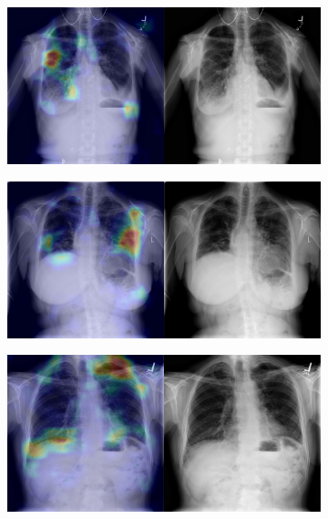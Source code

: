 \begin{figure}[b]
    \centering
    \begin{subfigure}{0.4\textwidth}
        \centering
        \includegraphics[width=1.0\textwidth]{Chapters/5. Conclusiones/img/Fibrosis/1_1_00000092_003.png}
    \end{subfigure}
    \begin{subfigure}{0.4\textwidth}
        \centering
        \includegraphics[width=1.0\textwidth]{Chapters/5. Conclusiones/img/Fibrosis/1_1_00000181_052.png}
    \end{subfigure}
    \begin{subfigure}{0.4\textwidth}
        \centering
        \includegraphics[width=1.0\textwidth]{Chapters/5. Conclusiones/img/Fibrosis/1_1_00000733_003.png}

\end{subfigure}
\end{figure}
